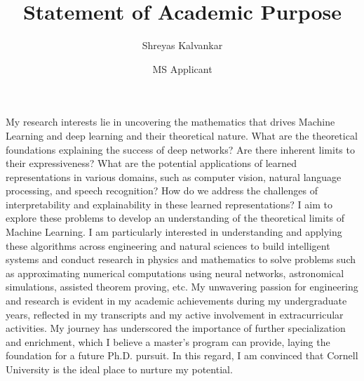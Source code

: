 \documentclass{article}
\title{Statement of Academic Purpose}
\author{Shreyas Kalvankar}
\date{MS Applicant}
\begin{document}
  \maketitle%
  \thispagestyle{empty}

\vspace{5pt} 
\hspace{0.25in}My research interests lie in uncovering the mathematics that
drives Machine Learning and deep learning and their theoretical nature. What are
the theoretical foundations explaining the success of deep networks? Are there
inherent limits to their expressiveness? What are the potential applications of
learned representations in various domains, such as computer vision, natural
language processing, and speech recognition? How do we address the challenges of
interpretability and explainability in these learned representations? I aim to
explore these problems to develop an understanding of the theoretical limits of
Machine Learning. I am particularly interested in understanding and applying
these algorithms across engineering and natural sciences to build intelligent
systems and conduct research in physics and mathematics to solve problems such
as approximating numerical computations using neural networks, astronomical
simulations, assisted theorem proving, etc. My unwavering passion for
engineering and research is evident in my academic achievements during my
undergraduate years, reflected in my transcripts and my active involvement in
extracurricular activities. My journey has underscored the importance of further
specialization and enrichment, which I believe a master's program can provide,
laying the foundation for a future Ph.D. pursuit. In this regard, I am convinced
that Cornell University is the ideal place to nurture my potential.
\end{document}
